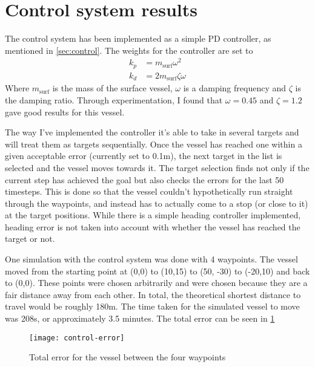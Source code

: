 \section{Control system results}
The control system has been implemented as a simple PD controller, as mentioned in \cref{sec:control}. The weights for the controller are set to 
\begin{align*}
k_p &= m_{\text{surf}}\omega^2 \\
k_d &= 2m_{\text{surf}}\zeta\omega
\end{align*}
Where \(m_{\text{surf}}\) is the mass of the surface vessel, \(\omega\) is a damping frequency and \(\zeta\) is the damping ratio. Through experimentation, I found that \(\omega = 0.45\) and \(\zeta = 1.2\) gave good results for this vessel. 

The way I've implemented the controller it's able to take in several targets and will treat them as targets sequentially. Once the vessel has reached one within a given acceptable error (currently set to 0.1m), the next target in the list is selected and the vessel moves towards it. The target selection finds not only if the current step has achieved the goal but also checks the errors for the last 50 timesteps. This is done so that the vessel couldn't hypothetically run straight through the waypoints, and instead has to actually come to a stop (or close to it) at the target positions. While there is a simple heading controller implemented, heading error is not taken into account with whether the vessel has reached the target or not. 

One simulation with the control system was done with 4 waypoints. The vessel moved from the starting point at (0,0) to (10,15) to (50, -30) to (-20,10) and back to (0,0). These points were chosen arbitrarily and were chosen because they are a fair distance away from each other. In total, the theoretical shortest distance to travel would be roughly 180m. The time taken for the simulated vessel to move was 208s, or approximately 3.5 minutes. The total error can be seen in \cref{fig:error}

\begin{figure}
	\centering
	\texttt{[image: control-error]}
	\caption{Total error for the vessel between the four waypoints}
	\label{fig:error}
\end{figure}
